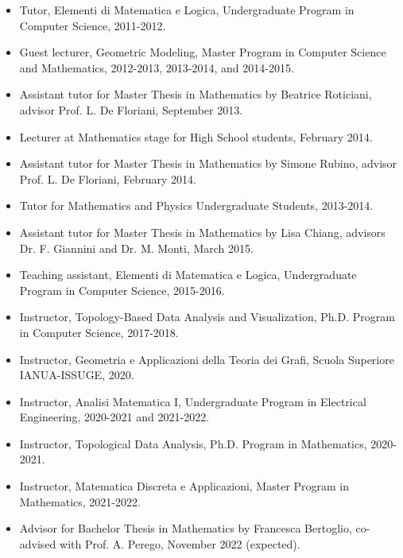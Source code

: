 \documentclass[11pt]{article}
\begin{document}
\begin{itemize}
\item Tutor, Elementi di Matematica e Logica, Undergraduate Program in Computer Science, 2011-2012.
\item Guest lecturer, Geometric Modeling, Master Program in Computer Science and Mathematics, 2012-2013, 2013-2014, and 2014-2015.
\item Assistant tutor for Master Thesis in Mathematics by Beatrice Roticiani, advisor Prof. L. De Floriani, September 2013.
\item Lecturer at Mathematics stage for High School students, February 2014.
\item Assistant tutor for Master Thesis in Mathematics by Simone Rubino, advisor Prof. L. De Floriani, February 2014.
\item Tutor for Mathematics and Physics Undergraduate Students, 2013-2014.
\item Assistant tutor for Master Thesis in Mathematics by Lisa Chiang, advisors Dr. F. Giannini and Dr. M. Monti, March 2015.
\item Teaching assistant, Elementi di Matematica e Logica, Undergraduate Program in Computer Science, 2015-2016.
\item Instructor, Topology-Based Data Analysis and Visualization, Ph.D. Program in Computer Science, 2017-2018.
\item Instructor, Geometria e Applicazioni della Teoria dei Grafi, Scuola Superiore IANUA-ISSUGE, 2020.
\item Instructor, Analisi Matematica I, Undergraduate Program in Electrical Engineering, 2020-2021 and 2021-2022.
\item Instructor, Topological Data Analysis, Ph.D. Program in Mathematics, 2020-2021.
\item Instructor, Matematica Discreta e Applicazioni, Master Program in Mathematics, 2021-2022.
\item Advisor for Bachelor Thesis in Mathematics by Francesca Bertoglio, co-advised with Prof. A. Perego, November 2022 (expected).
\end{itemize}
\end{document}
